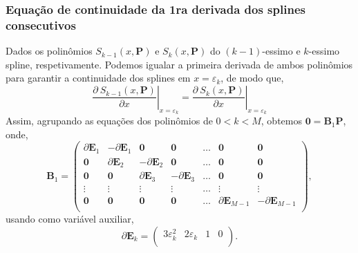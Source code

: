 \documentclass[a4paper,10pt]{article}
\begin{document}
\subsubsection{Equação de continuidade da 1ra derivada dos splines consecutivos}
\label{subsubsec:part1}
Dados os polinômios $S_{k-1}(x,\mathbf{P})$ e $S_{k}(x,\mathbf{P})$ do $(k-1)$-essimo e $k$-essimo spline,
respetivamente. Podemos igualar a primeira derivada de  ambos polinômios para garantir a continuidade dos splines em $x=\varepsilon_{k}$, 
de modo que,
\begin{equation}
 \left.\frac{\partial~S_{k-1}(x,\mathbf{P})}{\partial x}\right|_{x=\varepsilon_{k}} = 
 \left.\frac{\partial~S_{k}  (x,\mathbf{P})}{\partial x}\right|_{x=\varepsilon_{k}}
\end{equation}
Assim, agrupando as equações dos polinômios de  $0<k<M$, obtemos $\mathbf{0}=\mathbf{B}_1 \mathbf{P}$, onde,
\begin{equation}
\mathbf{B}_1 =\left(\begin{matrix}
\partial\mathbf{E}_1 & -\partial\mathbf{E}_1   & \mathbf{0}    &  \mathbf{0}   & \dots & \mathbf{0} & \mathbf{0}\\
\mathbf{0}   &  \partial\mathbf{E}_2   & -\partial\mathbf{E}_2 &  \mathbf{0}   & \dots & \mathbf{0} & \mathbf{0}\\
\mathbf{0}   &  \mathbf{0}     &  \partial\mathbf{E}_3 & -\partial\mathbf{E}_3 & \dots & \mathbf{0} & \mathbf{0}\\
\vdots       &  \vdots         &  \vdots       &  \vdots       & \dots & \vdots     & \vdots\\
\mathbf{0}   &  \mathbf{0}     &  \mathbf{0}   &  \mathbf{0}   & \dots & \partial\mathbf{E}_{M-1} & -\partial\mathbf{E}_{M-1} \\
\end{matrix}\right),
\end{equation}
usando como variável auxiliar,
\begin{equation}
\partial\mathbf{E}_k =\left(\begin{matrix}
3\varepsilon^2_k & 2\varepsilon_k   & 1 & 0  \\
\end{matrix}\right).
\end{equation}
\end{document}
